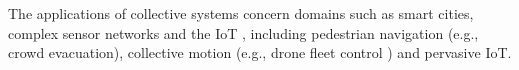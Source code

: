 The applications of collective systems concern domains such as smart cities,
complex sensor networks and the \ac{IoT} \cite{CAS-AggregateComputingBlocks},
including pedestrian navigation (e.g., crowd evacuation), collective motion
(e.g., drone fleet control \cite{CollectiveMotion-Quadcopter}) and pervasive
\ac{IoT}.
